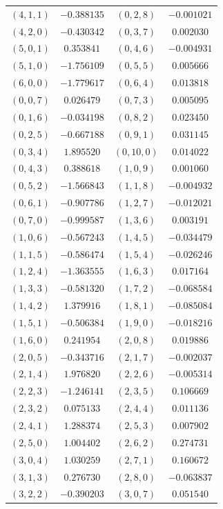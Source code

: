 \begin{table}
\begin{tabular}{cc@{\qquad}cc}
$(4,1,1)$ & $-0.388135$ & $(0,2,8)$ & $-0.001021$ \\
$(4,2,0)$ & $-0.430342$ & $(0,3,7)$ & $0.002030$ \\
$(5,0,1)$ & $0.353841$ & $(0,4,6)$ & $-0.004931$ \\
$(5,1,0)$ & $-1.756109$ & $(0,5,5)$ & $0.005666$ \\
$(6,0,0)$ & $-1.779617$ & $(0,6,4)$ & $0.013818$ \\
$(0,0,7)$ & $0.026479$ & $(0,7,3)$ & $0.005095$ \\
$(0,1,6)$ & $-0.034198$ & $(0,8,2)$ & $0.023450$ \\
$(0,2,5)$ & $-0.667188$ & $(0,9,1)$ & $0.031145$ \\
$(0,3,4)$ & $1.895520$ & $(0,10,0)$ & $0.014022$ \\
$(0,4,3)$ & $0.388618$ & $(1,0,9)$ & $0.001060$ \\
$(0,5,2)$ & $-1.566843$ & $(1,1,8)$ & $-0.004932$ \\
$(0,6,1)$ & $-0.907786$ & $(1,2,7)$ & $-0.012021$ \\
$(0,7,0)$ & $-0.999587$ & $(1,3,6)$ & $0.003191$ \\
$(1,0,6)$ & $-0.567243$ & $(1,4,5)$ & $-0.034479$ \\
$(1,1,5)$ & $-0.586474$ & $(1,5,4)$ & $-0.026246$ \\
$(1,2,4)$ & $-1.363555$ & $(1,6,3)$ & $0.017164$ \\
$(1,3,3)$ & $-0.581320$ & $(1,7,2)$ & $-0.068584$ \\
$(1,4,2)$ & $1.379916$ & $(1,8,1)$ & $-0.085084$ \\
$(1,5,1)$ & $-0.506384$ & $(1,9,0)$ & $-0.018216$ \\
$(1,6,0)$ & $0.241954$ & $(2,0,8)$ & $0.019886$ \\
$(2,0,5)$ & $-0.343716$ & $(2,1,7)$ & $-0.002037$ \\
$(2,1,4)$ & $1.976820$ & $(2,2,6)$ & $-0.005314$ \\
$(2,2,3)$ & $-1.246141$ & $(2,3,5)$ & $0.106669$ \\
$(2,3,2)$ & $0.075133$ & $(2,4,4)$ & $0.011136$ \\
$(2,4,1)$ & $1.288374$ & $(2,5,3)$ & $0.007902$ \\
$(2,5,0)$ & $1.004402$ & $(2,6,2)$ & $0.274731$ \\
$(3,0,4)$ & $1.030259$ & $(2,7,1)$ & $0.160672$ \\
$(3,1,3)$ & $0.276730$ & $(2,8,0)$ & $-0.063837$ \\
$(3,2,2)$ & $-0.390203$ & $(3,0,7)$ & $0.051540$ \\

\end{tabular}
\end{table}
